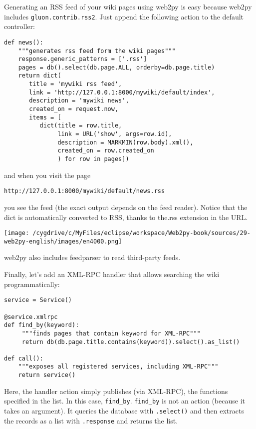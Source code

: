 \documentclass[justified,sixbynine,notoc]{tufte-book}
\def\ft{\small\tt}
\def\inxx#1{\index{#1}}
\begin{document}
\begin{fullwidth}
\inxx{rss}
Generating an RSS feed of your wiki pages using web2py is easy because web2py includes {\ft gluon.contrib.rss2}. Just append the following action to the default controller:
\begin{lstlisting}
def news():
    """generates rss feed form the wiki pages"""
    response.generic_patterns = ['.rss']
    pages = db().select(db.page.ALL, orderby=db.page.title)
    return dict(
       title = 'mywiki rss feed',
       link = 'http://127.0.0.1:8000/mywiki/default/index',
       description = 'mywiki news',
       created_on = request.now,
       items = [
          dict(title = row.title,
               link = URL('show', args=row.id),
               description = MARKMIN(row.body).xml(),
               created_on = row.created_on
               ) for row in pages])
\end{lstlisting}
\noindent and when you visit the page
\begin{lstlisting}[keywords={}]
http://127.0.0.1:8000/mywiki/default/news.rss
\end{lstlisting}
\noindent you see the feed (the exact output depends on the feed reader). Notice that the dict is automatically converted to RSS, thanks to the.rss extension in the URL.


\goodbreak\begin{center}\texttt{[image: /cygdrive/c/MyFiles/eclipse/workspace/Web2py-book/sources/29-web2py-english/images/en4000.png]}\end{center}

\noindent web2py also includes feedparser to read third-party feeds.

\inxx{XMLRPC}
Finally, let's add an XML-RPC handler that allows searching the wiki programmatically:
\begin{lstlisting}
service = Service()

@service.xmlrpc
def find_by(keyword):
     """finds pages that contain keyword for XML-RPC"""
     return db(db.page.title.contains(keyword)).select().as_list()

def call():
    """exposes all registered services, including XML-RPC"""
    return service()
\end{lstlisting}

Here, the handler action simply publishes (via XML-RPC), the functions specified in the list. In this case, {\ft find\_by}. {\ft find\_by} is not an action (because it takes an argument). It queries the database with {\ft .select()} and then extracts the records as a list with {\ft .response} and returns the list.


\end{fullwidth}
\end{document}
